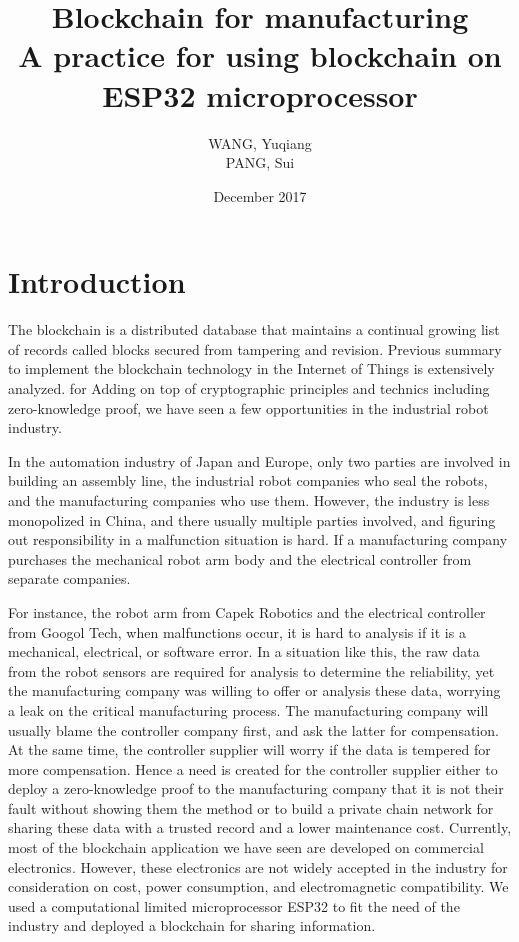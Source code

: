 \documentclass{article}
\title{Blockchain for manufacturing \\
 A practice for using blockchain on ESP32 microprocessor}
\author{WANG, Yuqiang \\ PANG, Sui}
\date{December 2017}
\begin{document}
\maketitle

\section{Introduction}
    The blockchain is a distributed database that maintains a continual growing list of records called blocks secured from tampering and revision. \citep{narayanan2016bitcoin} Previous summary to implement the blockchain technology in the Internet of Things is extensively analyzed. \citep{christidis2016blockchains} for  Adding on top of cryptographic principles and technics including zero-knowledge proof, we have seen a few opportunities in the industrial robot industry.

    In the automation industry of Japan and Europe, only two parties are involved in building an assembly line, the industrial robot companies who seal the robots, and the manufacturing companies who use them. However, the industry is less monopolized in China, and there usually multiple parties involved, and figuring out responsibility in a malfunction situation is hard. If a manufacturing company purchases the mechanical robot arm body and the electrical controller from separate companies.

    For instance, the robot arm from Capek Robotics and the electrical controller from Googol Tech, when malfunctions occur, it is hard to analysis if it is a mechanical, electrical, or software error. In a situation like this, the raw data from the robot sensors are required for analysis to determine the reliability, yet the manufacturing company was willing to offer or analysis these data, worrying a leak on the critical manufacturing process. The manufacturing company will usually blame the controller company first, and ask the latter for compensation. At the same time, the controller supplier will worry if the data is tempered for more compensation. Hence a need is created for the controller supplier either to deploy a zero-knowledge proof to the manufacturing company that it is not their fault without showing them the method or to build a private chain network for sharing these data with a trusted record and a lower maintenance cost. Currently, most of the blockchain application we have seen are developed on commercial electronics. However, these electronics are not widely accepted in the industry for consideration on cost, power consumption, and electromagnetic compatibility. We used a computational limited microprocessor ESP32 to fit the need of the industry and deployed a blockchain for sharing information.
\end{document}
